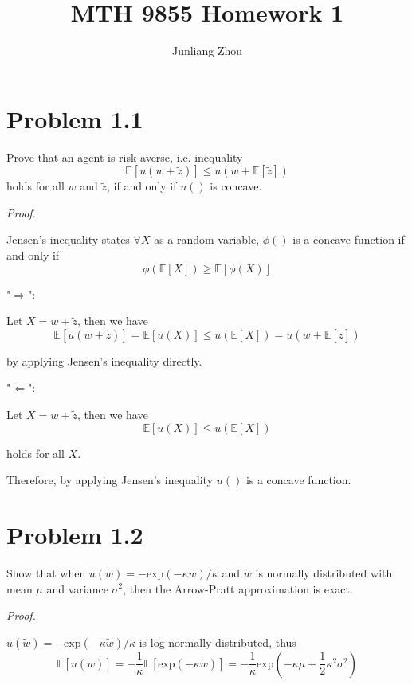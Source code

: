 \documentclass[a4paper]{article}
\title{MTH 9855 Homework 1}
\author{Junliang Zhou}
\begin{document}
\maketitle

\section{Problem 1.1}

Prove that an agent is risk-averse, i.e. inequality
\[\mathbb{E}[u(w+\tilde{z})] \leq u(w+\mathbb{E}[\tilde{z}])\]
holds for all $w$ and $\tilde{z}$, if and only if $u()$ is concave.\newline

\textit{Proof.}\newline

Jensen's inequality states $\forall X$ as a random variable, $\phi()$ is a concave function if and only if
\[\phi(\mathbb{E}[X]) \geq \mathbb{E}[\phi(X)]\]

"$\Rightarrow$":\newline

Let $X=w+\tilde{z}$, then we have
\[\mathbb{E}[u(w+\tilde{z})] = \mathbb{E}[u(X)] \leq u(\mathbb{E}[X]) = u(w+\mathbb{E}[\tilde{z}])\]

by applying Jensen's inequality directly.\newline

"$\Leftarrow$":\newline

Let $X=w+\tilde{z}$, then we have
\[\mathbb{E}[u(X)] \leq u(\mathbb{E}[X])\]

holds for all $X$.\newline

Therefore, by applying Jensen's inequality $u()$ is a concave function.

\section{Problem 1.2}

Show that when $u(w) = -\text{exp}(-\kappa w)/\kappa$ and $\tilde{w}$ is normally distributed with mean $\mu$ and variance $\sigma^2$, then the Arrow-Pratt approximation is exact.\newline

\textit{Proof.}\newline

$u(\tilde{w}) = -\text{exp}(-\kappa \tilde{w})/\kappa$ is log-normally distributed, thus
\[\mathbb{E}[u(\tilde{w})]=-\frac{1}{\kappa}\mathbb{E}[\text{exp}(-\kappa \tilde{w})]=-\frac{1}{\kappa}\text{exp}(-\kappa\mu+\frac{1}{2}\kappa^2 \sigma^2)\]
\end{document}
